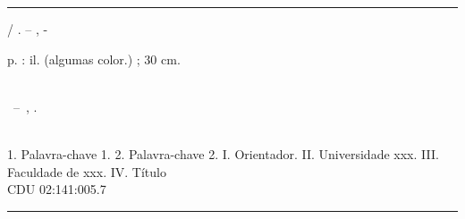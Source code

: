 %     
\begin{catalographiccard}
	\vspace*{\fill}					%
	\hrule							%
	\begin{center}					%
	\begin{minipage}[c]{12.5cm}		%

	\printauthor

	\hspace{0.5cm} \printtitle  / \printauthor. --
	\printlocal, \printdate-

	\hspace{0.5cm} \pageref{LastPage} p. : il. (algumas color.) ; 30 cm.\\

	\hspace{0.5cm} \printadvisorLabel~\printadvisor\\

	\hspace{0.5cm}
	\parbox[t]{\textwidth}{\printtypeofdocument~--~\printinstitution,
	\printdate.}\\

	\hspace{0.5cm}
		1. Palavra-chave 1.
		2. Palavra-chave 2.
		I. Orientador.
		II. Universidade xxx.
		III. Faculdade de xxx.
		IV. Título\\

	\hspace{8.75cm} CDU 02:141:005.7\\

	\end{minipage}
	\end{center}
	\hrule
\end{catalographiccard}
